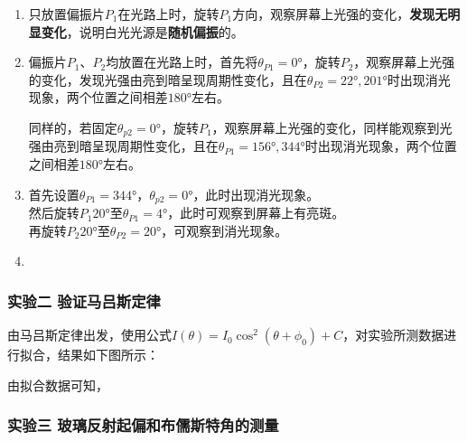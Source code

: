\documentclass[dvipsnames, svgnames,a4paper,11pt]{article}
\begin{document}
	\begin{enumerate}
		\item 只放置偏振片$P_1$在光路上时，旋转$P_1$方向，观察屏幕上光强的变化，\textbf{发现无明显变化}，说明白光光源是\textbf{随机偏振}的。
		\item 偏振片$P_1$、$P_2$均放置在光路上时，首先将$\theta_{P1}=\ang{0}$，旋转$P_2$，观察屏幕上光强的变化，发现光强由亮到暗呈现周期性变化，且在$\theta_{P2}=\ang{22},\ang{201}$时出现消光现象，两个位置之间相差$\ang{180}$左右。
		
		同样的，若固定$\theta_{p2}=\ang{0}$，旋转$P_1$，观察屏幕上光强的变化，同样能观察到光强由亮到暗呈现周期性变化，且在$\theta_{P1}=\ang{156},\ang{344}$时出现消光现象，两个位置之间相差$\ang{180}$左右。

		\item 首先设置$\theta_{P1}=\ang{344}$，$\theta_{p2}=\ang{0}$，此时出现消光现象。\\
			  然后旋转$P_1$$\ang{20}$至$\theta_{P1}=\ang{4}$，此时可观察到屏幕上有亮斑。\\
			  再旋转$P_2$$\ang{20}$至$\theta_{P2}=\ang{20}$，可观察到消光现象。

		\item 
	\end{enumerate}




	\subsubsection{实验二 \quad 验证马吕斯定律}

	由马吕斯定律出发，使用公式$I(\theta)=I_0\cos^2(\theta+\phi_0)+C$，对实验所测数据进行拟合，结果如下图所示：

	\begin{figure}[htbp]
		\centering
		\quad
		\quad
		\quad


		\label{fig:grap3-2}
	\end{figure}

	由拟合数据可知，
			



	\subsubsection{实验三 \quad 玻璃反射起偏和布儒斯特角的测量}
\end{document}
